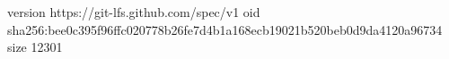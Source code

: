version https://git-lfs.github.com/spec/v1
oid sha256:bee0c395f96ffc020778b26fe7d4b1a168ecb19021b520beb0d9da4120a96734
size 12301

